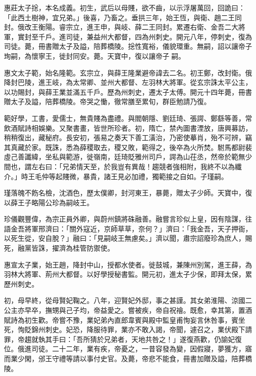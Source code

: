 \begin{pinyinscope}
 惠莊太子捴，本名成義。初生，武后以母賤，欲不齒，以示浮屠萬回，回詭曰：「此西土樹神，宜兄弟。」後喜，乃畜之。垂拱三年，始王恆，與衛、趙二王同封。俄改王衡陽。睿宗立，進王申，與岐、薛二王同封。累遷右衛、金吾二大將軍，實封至千戶。進司徒，兼益州大都督，四為州刺史。開元八年，停刺史，復為司徒。薨，冊書贈太子及謚，陪葬橋陵。捴性寬裕，儀貌環重。無嗣，詔以讓帝子珣嗣，為懷寧王，徙封同安。薨。天寶中，復以讓帝子嗣。



 惠文太子範，始名隆範。玄宗立，與薛王隆業避帝諱去二名。初王鄭，改封衛。俄降封巴陵，進王岐，為太常卿、並州大都督、左羽林大將軍。從玄宗誅太平公主，以功賜封，與薛王業並滿五千戶。歷為州刺史，遷太子太傅。開元十四年薨，冊書贈太子及謚，陪葬橋陵。帝哭之慟，徹常膳至累旬，群臣勉請乃復。



 範好學，工書，愛儒士，無貴賤為盡禮。與閻朝隱、劉廷琦、張諤、鄭繇等善，常飲酒賦詩相娛樂。又聚書畫，皆世所珍者。初，隋亡，禁內圖書湮放，唐興募訪，稍稍復出，藏秘府。長安初，張易之奏天下善工潢治，乃密使摹肖，殆不可辨，竊其真藏於家。既誅，悉為薛稷取去，稷又敗，範得之，後卒為火所焚。駙馬都尉裴虛己善讖緯，坐私與範游，徙嶺南，廷琦貶雅州司戶，諤為山茌丞，然帝於範無少間也，謂左右曰：「兄弟情天至，於我豈有異哉！趨競者強相附，我終不以為纖介。」時王毛仲等起賤微，暴貴，諸王見必加禮，獨範接之自如。子瑾嗣。



 瑾落魄不飭名檢，沈酒色，歷太僕卿，封河東王，暴薨，贈太子少師。天寶中，復以薛王子略陽公珍為嗣岐王。



 珍儀觀豐偉，為宗正員外卿，與蔚州鎮將硃融善。融嘗言珍似上皇，因有陰謀，往語金吾將軍邢濟曰：「關外寇近，京師草草，奈何？」濟曰：「我金吾，天子押衙，以死生從，安自脫？」融曰：「見嗣岐王無慮矣。」濟以聞，肅宗詔廢珍為庶人，賜死，融黨皆誅，擢濟為桂管防禦使。



 惠宣太子業，始王趙，降封中山，授都水使者。徙鼓城，兼陳州別駕，進王薛，為羽林大將軍、荊州大都督。以好學授秘書監。開元初，進太子少保，即拜太保，累歷州刺史。



 初，母早終，從母賢妃鞠之。八年，迎賢妃外邸，事之甚謹。其女弟淮陽、涼國二公主亦早卒，撫甥與己子均，帝益愛之。嘗被疾，帝自祝禬。既愈，幸其第，置酒賦詩為初生歡。帝嘗不豫，業妃弟內直郎韋賓與殿中監皇甫恂妄言休咎事，賓坐死，恂貶錦州刺史。妃恐，降服待罪，業亦不敢入謁，帝聞，遽召之，業伏殿下請罪，帝趨就執其手曰：「吾所猜於兄弟者，天地共咎之！」遂復燕歡，仍諭妃復位。俄進司徒。二十二年，業有疾，帝憂之，一昔容發為變，因假寢，夢獲方，寤而業少閑，邠王守禮等請以事付史官。及薨，帝悲不能食，冊書加贈及謚，陪葬橋陵。




\end{pinyinscope}
